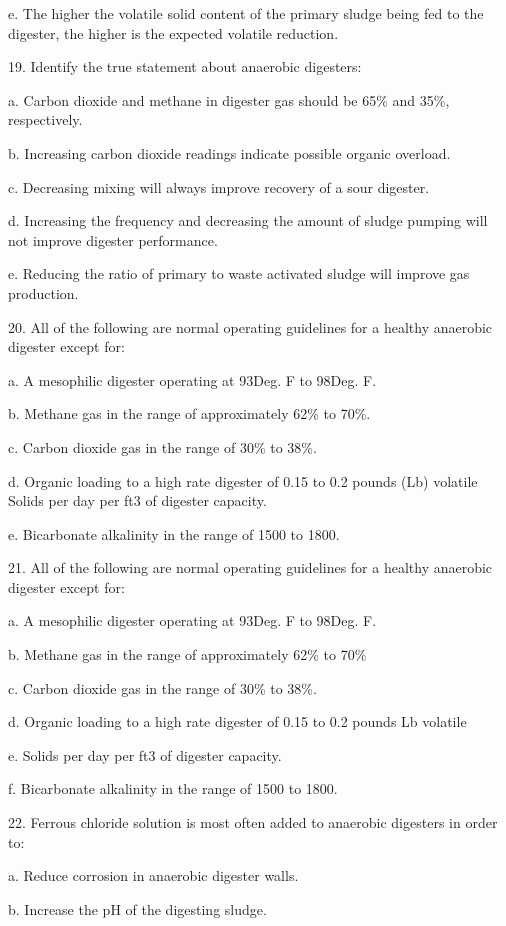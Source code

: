 \documentclass{article}
\begin{document}
e. The higher the volatile solid content of the primary sludge being fed to the digester, the higher is the expected volatile reduction. 


19. Identify the true statement about anaerobic digesters:

a. Carbon dioxide and methane in digester gas should be 65\% and 35\%, respectively. 

b. Increasing carbon dioxide readings indicate possible organic overload. 

c. Decreasing mixing will always improve recovery of a sour digester. 

d. Increasing the frequency and decreasing the amount of sludge pumping will not improve digester performance. 

e. Reducing the ratio of primary to waste activated sludge will improve gas production. 


20. All of the following are normal operating guidelines for a healthy anaerobic digester except for:

a. A mesophilic digester operating at 93Deg. F to 98Deg. F. 

b. Methane gas in the range of approximately 62\% to 70\%. 

c. Carbon dioxide gas in the range of 30\% to 38\%. 

d. Organic loading to a high rate digester of 0.15 to 0.2 pounds (Lb) volatile Solids per day per ft3 of digester capacity. 

e. Bicarbonate alkalinity in the range of 1500 to 1800. 


21. All of the following are normal operating guidelines for a healthy anaerobic digester except for:

a. A mesophilic digester operating at 93Deg. F to 98Deg. F. 

b. Methane gas in the range of approximately 62\% to 70\% 

c. Carbon dioxide gas in the range of 30\% to 38\%. 

d. Organic loading to a high rate digester of 0.15 to 0.2 pounds Lb volatile 

e. Solids per day per ft3 of digester capacity. 

f. Bicarbonate alkalinity in the range of 1500 to 1800. 


22. Ferrous chloride solution is most often added to anaerobic digesters in order to:

a. Reduce corrosion in anaerobic digester walls. 

b. Increase the pH of the digesting sludge. 
\end{document}
